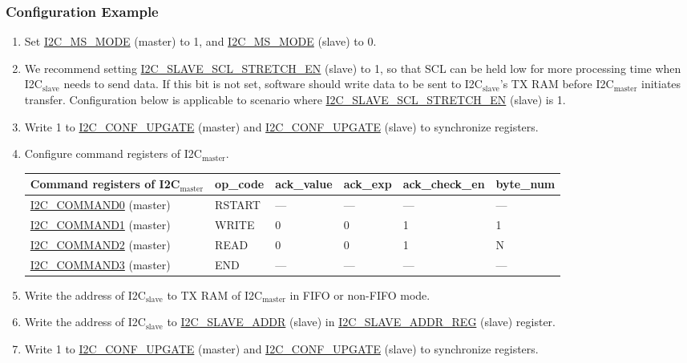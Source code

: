 \documentclass[main\_\_EN.tex]{subfiles}
\begin{document}
\subsubsection{Configuration Example}
\begin{enumerate}
\item Set \hyperref[fielddesc:I2CMSMODE]{I2C\_MS\_MODE} (master) to 1, and \hyperref[fielddesc:I2CMSMODE]{I2C\_MS\_MODE} (slave) to 0.
\item We recommend setting \hyperref[fielddesc:I2CSLAVESCLSTRETCHEN]{I2C\_SLAVE\_SCL\_STRETCH\_EN} (slave) to 1, so that SCL can be held low for more processing time when I2C$_\text{slave}$ needs to send data. If this bit is not set, software should write data to be sent to I2C$_\text{slave}$'s TX RAM before I2C$_\text{master}$ initiates transfer. Configuration below is applicable to scenario where \hyperref[fielddesc:I2CSLAVESCLSTRETCHEN]{I2C\_SLAVE\_SCL\_STRETCH\_EN} (slave) is 1.
\item Write 1 to \hyperref[fielddesc:I2CCONFUPGATE]{I2C\_CONF\_UPGATE} (master) and \hyperref[fielddesc:I2CCONFUPGATE]{I2C\_CONF\_UPGATE} (slave) to synchronize registers.
\item Configure command registers of I2C$_\text{master}$.
\begin{longtable}{ | p{4cm} | p{2cm} | p{2cm} | p{2cm} |p{2cm} | p{2cm} |}
\hline\rowcolor{lightgray}
Command registers of I2C$_\text{master}$& op\_code & ack\_value&ack\_exp&ack\_check\_en&byte\_num  \\ \hline
\hyperref[fielddesc:I2CCOMMAND0]{I2C\_COMMAND0} (master)& RSTART& ---&---&---&---  \\ \hline
\hyperref[fielddesc:I2CCOMMAND1]{I2C\_COMMAND1} (master)& WRITE& 0&0&1&1  \\ \hline
\hyperref[fielddesc:I2CCOMMAND2]{I2C\_COMMAND2} (master)& READ& 0&0&1&N  \\ \hline
\hyperref[fielddesc:I2CCOMMAND3]{I2C\_COMMAND3} (master)& END& ---&---&---&---  \\ \hline
\end{longtable}
\item Write the address of I2C$_\text{slave}$ to TX RAM of I2C$_\text{master}$ in FIFO or non-FIFO mode.
\item Write the address of I2C$_\text{slave}$ to \hyperref[fielddesc:I2CSLAVEADDR]{I2C\_SLAVE\_ADDR} (slave) in \hyperref[regdesc:I2CSLAVEADDRREG]{I2C\_SLAVE\_ADDR\_REG} (slave) register.
\item Write 1 to \hyperref[fielddesc:I2CCONFUPGATE]{I2C\_CONF\_UPGATE} (master) and \hyperref[fielddesc:I2CCONFUPGATE]{I2C\_CONF\_UPGATE} (slave) to synchronize registers.

\end{enumerate}
\end{document}
